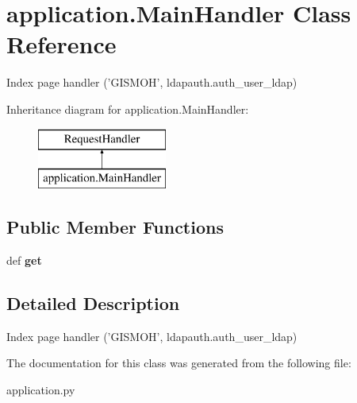 \hypertarget{classapplication_1_1_main_handler}{\section{application.\-Main\-Handler Class Reference}
\label{classapplication_1_1_main_handler}
}


Index page handler ('G\-I\-S\-M\-O\-H', ldapauth.\-auth\-\_\-user\-\_\-ldap)  


Inheritance diagram for application.\-Main\-Handler\-:\begin{figure}[H]
\begin{center}
\leavevmode
\includegraphics[height=2.000000cm]{classapplication_1_1_main_handler}
\end{center}
\end{figure}
\subsection*{Public Member Functions}
\begin{DoxyCompactItemize}
\item 
\hypertarget{classapplication_1_1_main_handler_ae71c755ef5ff2ae9b026ebdbaf60ea69}{def {\bfseries get}}\label{classapplication_1_1_main_handler_ae71c755ef5ff2ae9b026ebdbaf60ea69}

\end{DoxyCompactItemize}


\subsection{Detailed Description}
Index page handler ('G\-I\-S\-M\-O\-H', ldapauth.\-auth\-\_\-user\-\_\-ldap) 

The documentation for this class was generated from the following file\-:\begin{DoxyCompactItemize}
\item 
application.\-py\end{DoxyCompactItemize}
